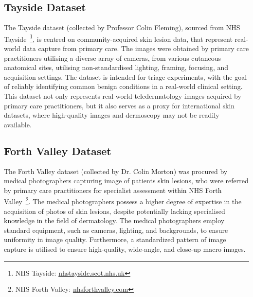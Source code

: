 \subsection{Tayside Dataset}
\label{subsec:tayside_dataset}
The Tayside dataset (collected by Professor Colin Fleming), sourced from NHS Tayside~\footnote{NHS Tayside: \url{nhstayside.scot.nhs.uk}}, is centred on community-acquired skin lesion data, that represent real-world data capture from primary care. The images were obtained by primary care practitioners utilising a diverse array of cameras, from various cutaneous anatomical sites, utilising non-standardised lighting, framing, focusing, and acquisition settings. The dataset is intended for triage experiments, with the goal of reliably identifying common benign conditions in a real-world clinical setting. This dataset not only represents real-world teledermatology images acquired by primary care practitioners, but it also serves as a proxy for international skin datasets, where high-quality images and dermoscopy may not be readily available.

\subsection{Forth Valley Dataset}
\label{subsec:forth_valley_dataset}
The Forth Valley dataset (collected by Dr. Colin Morton) was procured by medical photographers capturing image of patients skin lesions, who were referred by primary care practitioners for specialist assessment within NHS Forth Valley~\footnote{NHS Forth Valley: \url{nhsforthvalley.com}}. The medical photographers possess a higher degree of expertise in the acquisition of photos of skin lesions, despite potentially lacking specialised knowledge in the field of dermatology. The medical photographers employ standard equipment, such as cameras, lighting, and backgrounds, to ensure uniformity in image quality. Furthermore, a standardized pattern of image capture is utilised to ensure high-quality, wide-angle, and close-up macro images.

